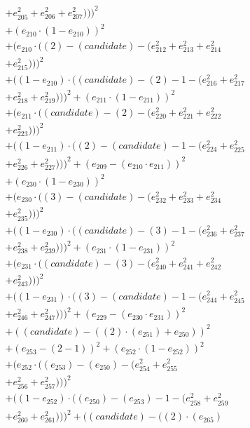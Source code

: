 \documentclass[10pt, a4paper]{article}
\begin{document}
\begin{align*}
& + e_{205}^{2} + e_{206}^{2} + e_{207}^{2})))^{2} \\
& + (e_{210}  \cdot  (1 - e_{210}))^{2} \\
& + (e_{210}  \cdot  ((2) - (candidate) - (e_{212}^{2} + e_{213}^{2} + e_{214}^{2} \\
& + e_{215}^{2})))^{2} \\
& + ((1 - e_{210})  \cdot  ((candidate) - (2) - 1 - (e_{216}^{2} + e_{217}^{2} \\
& + e_{218}^{2} + e_{219}^{2})))^{2} + (e_{211}  \cdot  (1 - e_{211}))^{2} \\
& + (e_{211}  \cdot  ((candidate) - (2) - (e_{220}^{2} + e_{221}^{2} + e_{222}^{2} \\
& + e_{223}^{2})))^{2} \\
& + ((1 - e_{211})  \cdot  ((2) - (candidate) - 1 - (e_{224}^{2} + e_{225}^{2} \\
& + e_{226}^{2} + e_{227}^{2})))^{2} + (e_{209} - (e_{210}  \cdot  e_{211}))^{2} \\
& + (e_{230}  \cdot  (1 - e_{230}))^{2} \\
& + (e_{230}  \cdot  ((3) - (candidate) - (e_{232}^{2} + e_{233}^{2} + e_{234}^{2} \\
& + e_{235}^{2})))^{2} \\
& + ((1 - e_{230})  \cdot  ((candidate) - (3) - 1 - (e_{236}^{2} + e_{237}^{2} \\
& + e_{238}^{2} + e_{239}^{2})))^{2} + (e_{231}  \cdot  (1 - e_{231}))^{2} \\
& + (e_{231}  \cdot  ((candidate) - (3) - (e_{240}^{2} + e_{241}^{2} + e_{242}^{2} \\
& + e_{243}^{2})))^{2} \\
& + ((1 - e_{231})  \cdot  ((3) - (candidate) - 1 - (e_{244}^{2} + e_{245}^{2} \\
& + e_{246}^{2} + e_{247}^{2})))^{2} + (e_{229} - (e_{230}  \cdot  e_{231}))^{2} \\
& + ((candidate) - ((2)  \cdot  (e_{251}) + e_{250}))^{2} \\
& + (e_{253} - (2 - 1))^{2} + (e_{252}  \cdot  (1 - e_{252}))^{2} \\
& + (e_{252}  \cdot  ((e_{253}) - (e_{250}) - (e_{254}^{2} + e_{255}^{2} \\
& + e_{256}^{2} + e_{257}^{2})))^{2} \\
& + ((1 - e_{252})  \cdot  ((e_{250}) - (e_{253}) - 1 - (e_{258}^{2} + e_{259}^{2} \\
& + e_{260}^{2} + e_{261}^{2})))^{2} + ((candidate) - ((2)  \cdot  (e_{265}) \\

\end{align*}
\end{document}
